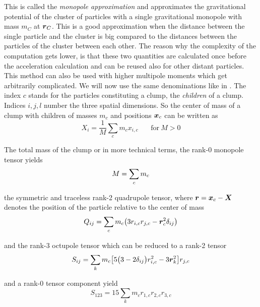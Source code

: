 This is called the \emph{monopole approximation} and approximates the gravitational potential of the cluster of particles with a single gravitational monopole with mass $m_C$ at $\boldsymbol{r}_C$. This is a good approximation when the distance between the single particle and the cluster is big compared to the distances between the particles of the cluster between each other. The reason why the complexity of the computation gets lower, is that these two quantities are calculated once before the acceleration calculation and can be reused also for other distant particles. \\

This method can also be used with higher multipole moments which get arbitrarily complicated. We will now use the same denominations like in \cite{1993ApJ...414..200M}. The index $c$ stands for the particles constituting a clump, the \emph{children} of a clump. Indices $i, j, l$ number the three spatial dimensions. So the center of mass of a clump with children of masses $m_{c}$ and positions $\boldsymbol{x}_{c}$ can be written as
\begin{equation}
X_{i} = \frac{1}{M} \sum_{c} m_{c} x_{i, c} ~~~~~~~~ \text{for}~M > 0
\end{equation}

The total mass of the clump or in more technical terms, the rank-0 monopole tensor yields
\begin{equation}
M = \sum_{c} m_c \\
\end{equation}

the symmetric and traceless rank-2 quadrupole tensor, where $\boldsymbol{r} = \boldsymbol{x}_{c} - \boldsymbol{X} $ denotes the position of the particle relative to the center of mass
\begin{equation}
Q_{ij} = \sum_{c} m_c \big( 3 r_{i, c} r_{j, c} - \boldsymbol{r}_{c}^2 \delta_{i j} \big) \\
\end{equation}

and the rank-3 octupole tensor which can be reduced to a rank-2 tensor
\begin{equation}
S_{ij}  = \sum_{k} m_c \big[ 5 \big( 3 - 2  \delta_{i j} \big) r_{i, c}^2 - 3 \boldsymbol{r}_{k}^2 \big] r_{j, c}\\
\end{equation}

and a rank-0 tensor component yield
\begin{equation}
S_{1 2 3} = 15 \sum_{k} m_c r_{1, c} r_{2, c} r_{3, c}
\end{equation}

